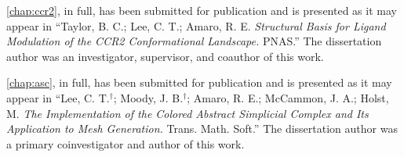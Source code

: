 \begin{frontmatter}
\begin{acknowledgements}
\par \cref{chap:ccr2}, in full, has been submitted for publication and is presented as it may appear in ``Taylor, B. C.; Lee, C. T.; Amaro, R. E. \emph{Structural Basis for Ligand Modulation of the CCR2 Conformational Landscape.} PNAS.''
The dissertation author was an investigator, supervisor, and coauthor of this work.

\par \cref{chap:asc}, in full, has been submitted for publication and is presented as it may appear in
``Lee, C. T.$^{\dagger}$; Moody, J. B.$^{\dagger}$; Amaro, R. E.; McCammon, J. A.; Holst, M. \emph{The Implementation of the Colored Abstract Simplicial Complex and Its Application to Mesh Generation.} Trans. Math. Soft.''
The dissertation author was a primary coinvestigator and author of this work.
\end{acknowledgements}



\end{frontmatter}
